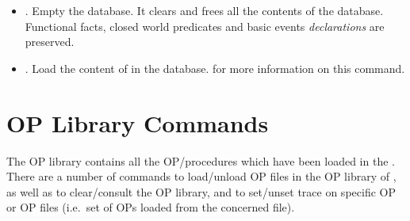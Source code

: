 \begin{itemize}
\item {}. Empty the database. It clears and frees all the contents
of the database. Functional facts, closed world predicates and basic events
\emph{declarations} are preserved.

\item {}. Load the content of 
in the database.  for more information on
this command.

\end{itemize}

\section{\CPK{} OP Library Commands}

The OP library contains all the OP/procedures which have been loaded in the
\CPK{}. There are a number of commands to load/unload OP files in the OP
library of \aCPK{}, as well as to clear/consult the OP library, and to
set/unset trace on specific OP or OP files (i.e.\ set of OPs loaded from the
concerned file).

